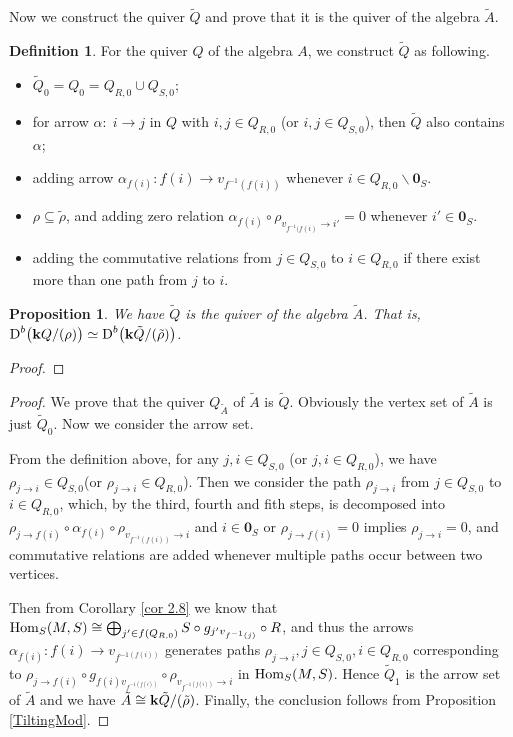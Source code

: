\documentclass[a4paper, reqno]{amsart}
\newtheorem{prop}[thm]{Proposition}
\theoremstyle{definition}
\newtheorem{defn}[thm]{Definition}
\theoremstyle{remark}
\numberwithin{equation}{section}
\begin{document}
\newpage

Now we construct the quiver $\tilde{Q}$ and prove that it is the quiver of the algebra $\tilde{A}$.

\begin{defn}
For the quiver $Q$ of the algebra $A$, we construct $\tilde{Q}$ as following.
\begin{itemize}
    \item $\tilde{Q}_0=Q_0=Q_{R,0}\cup Q_{S,0}$;
    \item for arrow $\alpha:\;i\rightarrow j$ in $Q$ with $i,j\in Q_{R,0}$ (or $i,j\in Q_{S,0}$), then $\tilde{Q}$ also contains $\alpha$;
    \item adding arrow $\alpha_{f(i)} : f(i) \to v_{f^{-1}(f(i))} $ whenever $i\in Q_{R,0}\backslash\mathbf{0}_S$. 
    \item  $\rho\subseteq \tilde{\rho}$, and adding zero relation $\alpha_{f(i)}\circ \rho_{v_{f^{-1}(f(i)}\to i'} =0 $ whenever $i' \in \mathbf{0}_S$. 
    \item adding the commutative relations from $j\in Q_{S,0}$ to $i\in Q_{R,0}$ if there exist more than one path from $j$ to $i$.
\end{itemize}
\end{defn}

\begin{prop} \label{prop 2.10}
We have $\tilde{Q}$ is the quiver of the algebra $\tilde{A}$. That is, $\textup{D}^b\big({\bf k} Q/(\rho)\big)\simeq \textup{D}^b\big({\bf k} \tilde{Q}/(\tilde{\rho})\big)$.    
\end{prop}

\begin{proof}
    
\end{proof}

\begin{proof}
We prove that the quiver $Q_{\tilde{A}}$ of $\tilde{A}$ is $\tilde{Q}$. Obviously the vertex set of $\tilde{A}$ is just $\tilde{Q}_0$. Now we consider the arrow set.

From the definition above, for any $j,i\in Q_{S,0}$ (or $j,i\in Q_{R,0}$), we have $\rho_{j\to i}\in Q_{S,0}$(or $\rho_{j\to i}\in Q_{R,0}$). Then we consider the path $\rho_{j\to i}$ from $j\in Q_{S,0}$ to $i\in Q_{R,0}$, which, by the third, fourth and fith steps, is decomposed into $\rho_{j\to f(i)} \circ \alpha_{f(i)} \circ \rho_{v_{f^{-1}(f(i))} \to i}$ and $i\in \mathbf{0}_S$ or $\rho_{j\to f(i)} = 0$ implies $ \rho_{j\to i} = 0$, and commutative relations are added whenever multiple paths occur between two vertices. 

Then from Corollary \ref{cor 2.8} we know that $\textup{Hom}_S(M,S) \cong \bigoplus_{j'\in f(Q_{R,0})} S \circ g_{j'v_{f^{-1}(j)}} \circ R $, and thus the arrows $\alpha_{f(i)}: f(i) \to v_{f^{-1(f(i))}} $ generates paths $ \rho_{j\to i}, j\in Q_{S,0}, i\in Q_{R,0}$ corresponding to $\rho_{j\to f(i)}\circ g_{f(i)v_{f^{-1(f(i))}}} \circ \rho_{v_{f^{-1(f(i))}} \to i}$ in $\textup{Hom}_S(M,S)$. Hence $\tilde{Q}_1$ is the arrow set of $\tilde{A}$ and we have $\tilde{A}\cong {\bf k} \tilde{Q}/(\tilde{\rho})$. Finally, the conclusion follows from Proposition \ref{TiltingMod}.
\end{proof}
\end{document}
